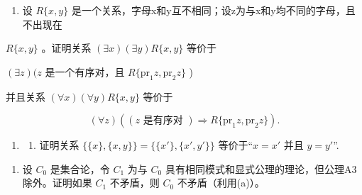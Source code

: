 \exercisegroup

\begin{enumerate}
\def\labelenumi{\arabic{enumi}.}
\tightlist
\item
  设 \(R\{x, y\}\) 是一个关系，字母x和y互不相同；设z为与x和y均不同的字母，且不出现在
\end{enumerate}

\(R\{x, y\}\) 。证明关系 \((\exists x)(\exists y)R\{x, y\}\) 等价于

\((\exists z)(z\) 是一个有序对，且 \(R\{\mathrm{pr}_1z, \mathrm{pr}_2z\}\) )

并且关系 \((\forall x)(\forall y)R\{x, y\}\) 等价于

\[
(\forall z) ((z \text {   是有序对 }) \Longrightarrow R \{\mathrm{pr} _ {1} z, \mathrm{pr} _ {2} z \}).
\]

\begin{enumerate}
\def\labelenumi{\arabic{enumi}.}
\setcounter{enumi}{1}
\tightlist
\item
  \begin{enumerate}
  \def\labelenumii{(\alph{enumii})}
  \tightlist
  \item
    证明关系 \(\{\{x\}, \{x, y\}\} = \{\{x'\}, \{x', y'\}\}\) 等价于“\(x = x'\) 并且 \(y = y'\)''.
  \end{enumerate}
\end{enumerate}

\begin{enumerate}
\def\labelenumi{(\alph{enumi})}
\setcounter{enumi}{1}
\tightlist
\item
  设 \(C_{0}\) 是集合论，令 \(C_{1}\) 为与 \(C_{0}\) 具有相同模式和显式公理的理论，但公理A3除外。证明如果 \(C_{1}\) 不矛盾，则 \(C_{0}\) 不矛盾（利用(a)）。
\end{enumerate}


